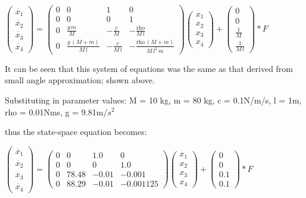 \documentclass[12pt]{article}
\begin{document}
$
\left(\begin{array}{c} \dot{x_{1}}\\ \dot{x_{2}}\\ \dot{x_{3}}\\ \dot{x_{4}} \end{array}\right)
 = 
 \left(\begin{array}{cccc} 0 & 0 & 1 & 0\\ 0 & 0 & 0 & 1\\ 0 & \frac{g\, m}{M} & -\frac{c}{M} & -\frac{\mathrm{rho}}{M\, l}\\ 0 & \frac{g\, \left(M + m\right)}{M\, l} & -\frac{c}{M\, l} & -\frac{\mathrm{rho}\, \left(M + m\right)}{M\, l^2\, m} \end{array}\right)
\left(\begin{array}{c} x_{1}\\ x_{2}\\ x_{3}\\ x_{4} \end{array}\right)
+
\left(\begin{array}{c} 0\\ 0\\ \frac{1}{M}\\ \frac{1}{M\, l} \end{array}\right)
*F$


\vspace{\baselineskip}



It can be seen that this system of equations was the same as that derived from small angle approximation; shown above.

Substituting in parameter values: M = 10 kg,	 m = 80 kg,	
c = 0.1N/m/s,	 l = 1m,	rho = 0.01Nms,	 g = 9.81m/$s^2$

thus the state-space equation becomes:

\vspace{\baselineskip}


$
\left(\begin{array}{c} \dot{x_{1}}\\ \dot{x_{2}}\\ \dot{x_{3}}\\ \dot{x_{4}} \end{array}\right)
 = 
 \left(\begin{array}{cccc} 0 & 0 & 1.0 & 0\\ 0 & 0 & 0 & 1.0\\ 0 & 78.48 & -0.01 & -0.001\\ 0 & 88.29 & -0.01 & -0.001125 \end{array}\right)
\left(\begin{array}{c} x_{1}\\ x_{2}\\ x_{3}\\ x_{4} \end{array}\right)
+
\left(\begin{array}{c} 0\\ 0\\ 0.1\\ 0.1 \end{array}\right)
*F$
\end{document}

